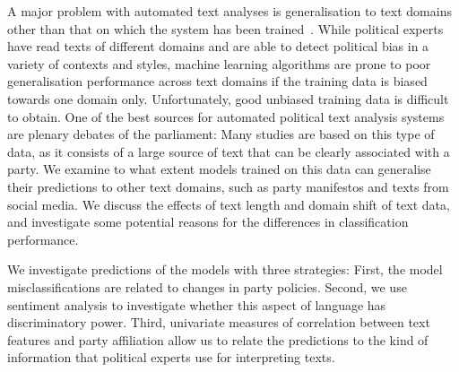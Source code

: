\documentclass[11pt]{article}
\begin{document}
A major problem with automated text analyses is generalisation to text domains other than that on which the system has been trained~\cite{Slapin.2014}. 
While political experts have read texts of different domains and are able to detect political bias in a variety of contexts and styles, machine learning algorithms are prone to poor generalisation performance across text domains if the training data is biased towards one domain only. Unfortunately, good unbiased training data is difficult to obtain. One of the best sources for automated political text analysis systems are plenary debates of the parliament: Many studies are based on this type of data, as it consists of a large source of text that can be clearly associated with a party. We examine to what extent models trained on this data can generalise their predictions to other text domains, such as party manifestos and texts from social media. 
We discuss the effects of text length and domain shift of text data, and investigate some potential reasons for the differences in classification performance. 

We investigate predictions of the models with three strategies: First, the model misclassifications are related to changes in party policies. Second, we use sentiment analysis to investigate whether this aspect of language has discriminatory power. Third, univariate measures of correlation between text features and party affiliation allow us to relate the predictions to the kind of information that political experts use for interpreting texts. 
\end{document}
